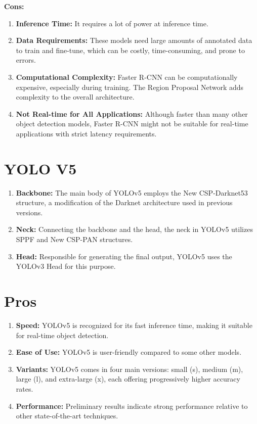 \documentclass{article}
\begin{document}
\textbf{Cons:}
\begin{enumerate}
  \item \textbf{Inference Time:} It requires a lot of power at inference time.
  \item \textbf{Data Requirements:} These models need large amounts of annotated data to train and fine-tune, which can be costly, time-consuming, and prone to errors.
  \item \textbf{Computational Complexity:} Faster R-CNN can be computationally expensive, especially during training. The Region Proposal Network adds complexity to the overall architecture.
  \item \textbf{Not Real-time for All Applications:} Although faster than many other object detection models, Faster R-CNN might not be suitable for real-time applications with strict latency requirements.
\end{enumerate}


\section{YOLO V5}

\begin{enumerate}
    \item \textbf{Backbone:} The main body of YOLOv5 employs the New CSP-Darknet53 structure, a modification of the Darknet architecture used in previous versions.
    
    \item \textbf{Neck:} Connecting the backbone and the head, the neck in YOLOv5 utilizes SPPF and New CSP-PAN structures.
    
    \item \textbf{Head:} Responsible for generating the final output, YOLOv5 uses the YOLOv3 Head for this purpose.
\end{enumerate}

\section{Pros}

\begin{enumerate}
    \item \textbf{Speed:} YOLOv5 is recognized for its fast inference time, making it suitable for real-time object detection.
    
    \item \textbf{Ease of Use:} YOLOv5 is user-friendly compared to some other models.
    
    \item \textbf{Variants:} YOLOv5 comes in four main versions: small (s), medium (m), large (l), and extra-large (x), each offering progressively higher accuracy rates.
    
    \item \textbf{Performance:} Preliminary results indicate strong performance relative to other state-of-the-art techniques.
\end{enumerate}
\end{document}

